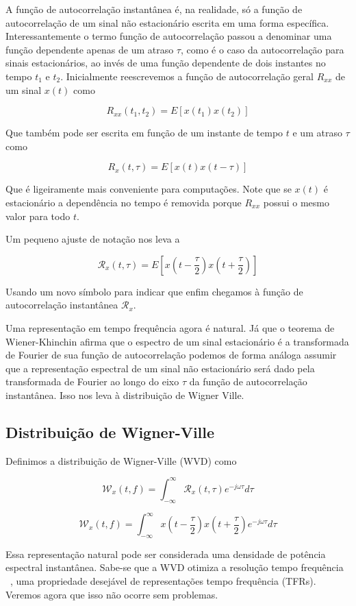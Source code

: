 A função de autocorrelação instantânea é, na realidade, só a função de
autocorrelação de um sinal não estacionário escrita em uma forma específica.
Interessantemente o termo função de autocorrelação passou a denominar uma
função dependente apenas de um atraso $\tau$, como é o caso da autocorrelação
para sinais estacionários, ao invés de uma função dependente de dois
instantes no tempo $t_1$ e $t_2$. Inicialmente reescrevemos a função de
autocorrelação geral $R_{xx}$ de um sinal $x(t)$ como

$$ R_{xx}(t_1, t_2) = E[x(t_1)x(t_2)] $$

Que também pode ser escrita em função de um instante de tempo $t$ e um atraso
$\tau$ como

$$ R_{x}(t, \tau) = E[x(t)x(t-\tau)] $$

Que é ligeiramente mais conveniente para computações. Note que se $x(t)$ é
estacionário a dependência no tempo é removida porque $R_{xx}$ possui o
mesmo valor para todo $t$.

Um pequeno ajuste de notação nos leva a

$$ \mathcal{R}_{x}(t, \tau) = E\left[x\left(t - \frac{\tau}{2}\right)x\left(t + \frac{\tau}{2}\right)\right] $$

Usando um novo símbolo para indicar que enfim chegamos à função de
autocorrelação instantânea $\mathcal{R}_{x}$.

Uma representação em tempo frequência agora é natural. Já que o
teorema de Wiener-Khinchin afirma que o espectro de um sinal estacionário é
a transformada de Fourier de sua função de autocorrelação podemos de forma
análoga assumir que a representação espectral de um sinal não estacionário
será dado pela transformada de Fourier ao longo do eixo $\tau$ da função de
autocorrelação instantânea. Isso nos leva à distribuição de Wigner Ville.

\subsection{Distribuição de Wigner-Ville}

Definimos a distribuição de Wigner-Ville (WVD) como

$$ \mathcal{W}_{x}(t, f) =  \int_{-\infty}^{\infty} \mathcal{R}_{x}(t, \tau) e^{-j\omega \tau}d\tau$$

$$ \mathcal{W}_{x}(t, f) =  \int_{-\infty}^{\infty} x\left(t - \frac{\tau}{2}\right)x\left(t + \frac{\tau}{2}\right) e^{-j\omega \tau}d\tau$$

Essa representação natural pode ser considerada uma densidade de potência
espectral instantânea. Sabe-se que a WVD otimiza a resolução tempo frequência
~\cite{tfr_comparison}, uma propriedade desejável de representações tempo
frequência (TFRs). Veremos agora que isso não ocorre sem problemas.

